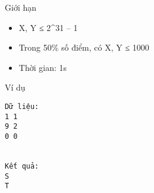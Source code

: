 Giới hạn
\begin{itemize}
	\item     X, Y ≤ 2^31 – 1   
	\item     Trong 50\% số điểm, có X, Y ≤ 1000   
	\item     Thời gian: 1s   
\end{itemize}
Ví dụ
\begin{verbatim}
Dữ liệu:
1 1
9 2
0 0


Kết quả:
S
T

\end{verbatim}